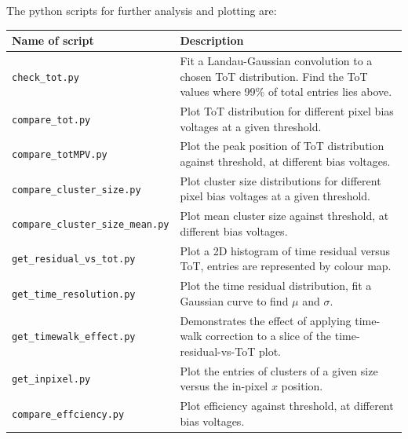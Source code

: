 The python scripts for further analysis and plotting are:
\begin{table}[h!]
    \centering
    \begin{tabular}{ | m{6cm} | m{8cm}| } 
         \hline
         Name of script & Description \\
         \hline         
         \verb|check_tot.py| & Fit a Landau-Gaussian convolution to a chosen ToT distribution. Find the ToT values where 99\% of  total entries lies above.\\
         \hline
         \verb|compare_tot.py| & Plot ToT distribution for different pixel bias voltages at a given threshold.\\
         \hline
         \verb|compare_totMPV.py| & Plot the peak position of ToT distribution against threshold, at different bias voltages.\\
         \hline
         \verb|compare_cluster_size.py| & Plot cluster size distributions for different pixel bias voltages at a given threshold.\\
         \hline
         \verb|compare_cluster_size_mean.py| & Plot mean cluster size against threshold, at different bias voltages.\\
         \hline
         \verb|get_residual_vs_tot.py| & Plot a 2D histogram of time residual versus ToT, entries are represented by colour map.\\
         \hline
         \verb|get_time_resolution.py| & Plot the time residual distribution, fit a Gaussian curve to find $\mu$ and $\sigma$.\\
         \hline
         \verb|get_timewalk_effect.py| & Demonstrates the effect of applying time-walk correction to a slice of the time-residual-vs-ToT plot.\\
         \hline
         \verb|get_inpixel.py| & Plot the entries of clusters of a given size versus the in-pixel $x$ position.\\
         \hline
         \verb|compare_effciency.py| & Plot efficiency against threshold, at different bias voltages.\\
         \hline
    \end{tabular}
\end{table}
